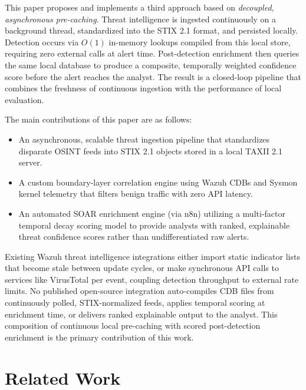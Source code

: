 \documentclass[conference]{IEEEtran}
\begin{document}
This paper proposes and implements a third approach based on \textit{decoupled, asynchronous pre-caching}. Threat intelligence is ingested continuously on a background thread, standardized into the STIX 2.1 format, and persisted locally. Detection occurs via $O(1)$ in-memory lookups compiled from this local store, requiring zero external calls at alert time. Post-detection enrichment then queries the same local database to produce a composite, temporally weighted confidence score before the alert reaches the analyst. The result is a closed-loop pipeline that combines the freshness of continuous ingestion with the performance of local evaluation.

The main contributions of this paper are as follows:
\begin{itemize}
    \item An asynchronous, scalable threat ingestion pipeline that standardizes disparate OSINT feeds into STIX 2.1 objects stored in a local TAXII 2.1 server.
    \item A custom boundary-layer correlation engine using Wazuh CDBs and Sysmon kernel telemetry that filters benign traffic with zero API latency.
    \item An automated SOAR enrichment engine (via n8n) utilizing a multi-factor temporal decay scoring model to provide analysts with ranked, explainable threat confidence scores rather than undifferentiated raw alerts.
\end{itemize}

Existing Wazuh threat intelligence integrations either import static indicator lists that become stale between update cycles, or make synchronous API calls to services like VirusTotal per event, coupling detection throughput to external rate limits. No published open-source integration auto-compiles CDB files from continuously polled, STIX-normalized feeds, applies temporal scoring at enrichment time, or delivers ranked explainable output to the analyst. This composition of continuous local pre-caching with scored post-detection enrichment is the primary contribution of this work.

\section{Related Work}
\end{document}
